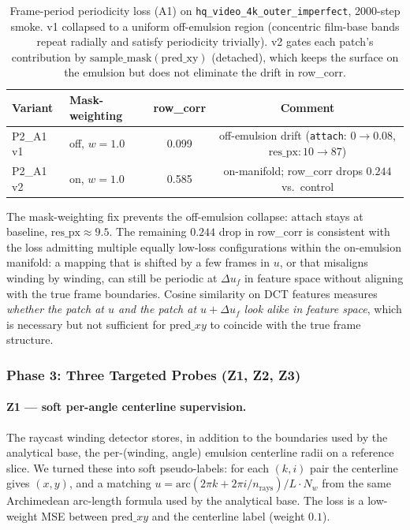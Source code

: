 \documentclass[11pt,a4paper]{article}
\begin{document}
\begin{table}[H]
\centering
\small
\begin{tabular}{llcc}
\toprule
Variant & Mask-weighting & row\_corr & Comment \\
\midrule
P2\_A1 v1 & off, $w = 1.0$ & 0.099 & off-emulsion drift (\texttt{attach}: $0 \to 0.08$, $\mathrm{res\_px}: 10 \to 87$) \\
P2\_A1 v2 & on, $w = 1.0$  & 0.585 & on-manifold; row\_corr drops $0.244$ vs.\ control \\
\bottomrule
\end{tabular}
\caption{Frame-period periodicity loss (A1) on \texttt{hq\_video\_4k\_outer\_imperfect}, 2000-step smoke. v1 collapsed to a uniform off-emulsion region (concentric film-base bands repeat radially and satisfy periodicity trivially). v2 gates each patch's contribution by $\mathrm{sample\_mask}(\mathrm{pred\_xy})$ (detached), which keeps the surface on the emulsion but does not eliminate the drift in row\_corr.}
\label{tab:phase2_a1}
\end{table}

The mask-weighting fix prevents the off-emulsion collapse: $\mathrm{attach}$ stays at baseline, $\mathrm{res\_px} \approx 9.5$. The remaining $0.244$ drop in row\_corr is consistent with the loss admitting multiple equally low-loss configurations within the on-emulsion manifold: a mapping that is shifted by a few frames in $u$, or that misaligns winding by winding, can still be periodic at $\Delta u_f$ in feature space without aligning with the true frame boundaries. Cosine similarity on DCT features measures \emph{whether the patch at $u$ and the patch at $u + \Delta u_f$ look alike in feature space}, which is necessary but not sufficient for $\mathrm{pred}\_xy$ to coincide with the true frame structure.

\subsubsection{Phase 3: Three Targeted Probes (Z1, Z2, Z3)}
\label{sec:phase3_zxx}

\paragraph{Z1 — soft per-angle centerline supervision.} The raycast winding detector stores, in addition to the boundaries used by the analytical base, the per-(winding, angle) emulsion centerline radii on a reference slice. We turned these into soft pseudo-labels: for each $(k, i)$ pair the centerline gives $(x, y)$, and a matching $u = \mathrm{arc}(2\pi k + 2\pi i / n_{\mathrm{rays}}) / L \cdot N_w$ from the same Archimedean arc-length formula used by the analytical base. The loss is a low-weight MSE between $\mathrm{pred}\_xy$ and the centerline label (weight $0.1$).
\end{document}
